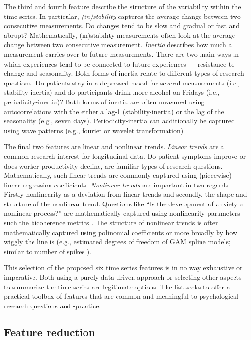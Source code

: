 \documentclass[man, 12pt, a4paper]{apa7}
\theoremstyle{break}
\theoremstyle{plain}
\begin{document}
The third and fourth feature describe the structure of the variability within the time series. In particular, \textit{(in)stability} captures the average change between two consecutive measurements. Do changes tend to be slow and gradual or fast and abrupt? Mathematically, (in)stability measurements often look at the average change between two consecutive measurement. \textit{Inertia} describes how much a measurement carries over to future measurements. There are two main ways in which experiences tend to be connected to future experiences --- resistance to change and seasonality. Both forms of inertia relate to different types of research questions. Do patients stay in a depressed mood for several measurements (i.e., stability-inertia) and do participants drink more alcohol on Fridays (i.e., periodicity-inertia)? Both forms of inertia are often measured using autocorrelations with the either a lag-1 (stability-inertia) or the lag of the seasonality (e.g., seven days). Periodicity-inertia can additionally be captured using wave patterns (e.g., fourier or wavelet transformation).

The final two features are linear and nonlinear trends. \textit{Linear trends} are a common research interest for longitudinal data. Do patient symptoms improve or does worker productivity decline, are familiar types of research questions. Mathematically, such linear trends are commonly captured using (piecewise) linear regression coefficients. \textit{Nonlinear trends} are important in two regards. Firstly nonlinearity as a deviation from linear trends and secondly, the shape and structure of the nonlinear trend. Questions like ``Is the development of anxiety a nonlinear process?'' are mathematically captured using nonlinearity parameters such the bicoherence metrics \citep{cuddy2009}. The structure of nonlinear trends is often mathematically captured using polinomial coefficients or more broadly by how wiggly the line is (e.g., estimated degrees of freedom of GAM spline models; similar to number of spikes \citealp[]{caro-martin2018}). 

This selection of the proposed six time series features is in no way exhaustive or imperative. Both using a purely data-driven approach or selecting other aspects to summarize the time series are legitimate options. The list seeks to offer a practical toolbox of features that are common and meaningful to psychological research questions and -practice.



\subsection{Feature reduction}
\end{document}
